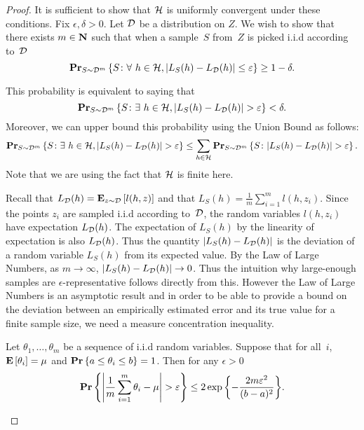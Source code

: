 \begin{proof}
It is sufficient to show that $\mathcal{H}$ is uniformly convergent under these
conditions. Fix $\epsilon, \delta > 0$. Let $\mathcal{D}$ be a distribution on $Z$. We
wish to show that there exists $m \in \mathbf{N}$ such that when a sample~$S$ from~$Z$
is picked i.i.d according to~$\mathcal{D}$
\[
    \mathbf{Pr}_{S \sim \mathcal{D}^m} \left \{ S \colon \forall \ h \in \mathcal{H},
             |L_S(h) - L_{\mathcal{D}}(h)| \leq \varepsilon \right \} \geq 1 - \delta.
\]

This probability is equivalent to saying that
\[
    \mathbf{Pr}_{S \sim \mathcal{D}^m} \left \{ S \colon \exists \ h \in \mathcal{H},
             |L_S(h) - L_{\mathcal{D}}(h)| > \varepsilon \right \} < \delta.
\]
Moreover, we can upper bound this probability using the Union Bound as follows:
\begin{equation} \label{eqn:union_bound}
    \mathbf{Pr}_{S \sim \mathcal{D}^m} \left \{ S \colon \exists \ h \in \mathcal{H},
             |L_S(h) - L_{\mathcal{D}}(h)| > \varepsilon \right \}
    \leq \sum_{h \in \mathcal{H}} \mathbf{Pr}_{S \sim \mathcal{D}^m} \left \{ S \colon |L_S(h) - L_{\mathcal{D}}(h)| > \varepsilon \right \}.
\end{equation}
Note that we are using the fact that $\mathcal{H}$ is finite here.

Recall that $L_{\mathcal{D}} (h) = \mathbf{E}_{z \sim \mathcal{D}} \left [ l(h, z) \right ]$ and that
$L_S (h) = \frac{1}{m} \sum_{i = 1}^m l(h, z_i)$. Since the points $z_i$ are sampled
i.i.d according to~$\mathcal{D}$, the random variables $l(h, z_i)$ have expectation
$L_{\mathcal{D}}(h)$. The expectation of $L_S(h)$ by the linearity of expectation is also
$L_{\mathcal{D}}(h)$. Thus the quantity $|L_S(h) - L_{\mathcal{D}}(h)|$ is the deviation of a
random variable $L_S(h)$ from its expected value. By the Law of Large Numbers, as
$m \to \infty$, $|L_S(h) - L_{\mathcal{D}}(h)| \to 0$. Thus the intuition why large-enough
samples are $\epsilon$-representative follows directly from this. However
the Law of Large Numbers is an asymptotic result and in order to be able
to provide a bound on the deviation between an empirically estimated error and its
true value for a finite sample size, we need a measure concentration inequality.

\begin{lemma}
Let $\theta_1, \ldots, \theta_m$ be a sequence of i.i.d random variables. Suppose that
for all~$i$, $\mathbf{E} \left [ \theta_i \right ] = \mu$ and $\mathbf{Pr} \left \{ a \leq \theta_i \leq b \right \} = 1$. Then
for any $\epsilon > 0$
\[
    \mathbf{Pr} \left \{ \left | \frac{1}{m} \sum_{i = 1}^m \theta_i - \mu \right | > \varepsilon \right \}
    \leq 2 \exp{\left \{ - \frac{2 m \varepsilon^2}{(b - a)^2} \right \}}.
\]
\end{lemma}


\end{proof}
